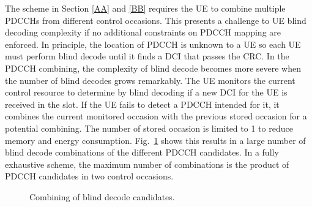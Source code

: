 \documentclass[conference,10pt]{IEEEtran}
\begin{document}
The scheme in Section \ref{AA} and \ref{BB} requires the UE to combine multiple PDCCHs from different control occasions. This presents a challenge to UE blind decoding complexity if no additional constraints on PDCCH mapping are enforced. In principle, the location of PDCCH is unknown to a UE so each UE must perform blind decode until it finds a DCI that passes the CRC. In the PDCCH combining, the complexity of blind decode becomes more severe when the number of blind decodes grows remarkably. The UE monitors the current control resource to determine by blind decoding if a new DCI for the UE is received in the slot. If the UE fails to detect a PDCCH intended for it, it combines the current monitored occasion with the previous stored occasion for a potential combining. The number of stored occasion is limited to 1 to reduce memory and energy consumption. Fig.~\ref{fig4} shows this results in a large number of blind decode combinations of the different PDCCH candidates. In a fully exhaustive scheme, the maximum number of combinations is the product of PDCCH candidates in two control occasions. 

\begin{figure}[htb]
\centering
{}
\hfill
\qquad
{}
\hfill

\caption{Combining of blind decode candidates.}
\label{fig4}
\end{figure}
\end{document}
